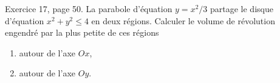\begin{exercice}\label{exo0027}

Exercice 17, page 50. La parabole d'équation $y=x^2/3$ partage le disque d'équation $x^2+y^2\leq 4$ en deux régions. Calculer le volume de révolution engendré par la plus petite de ces régions
\begin{enumerate}

\item
autour de l'axe $Ox$,
\item
autour de l'axe $Oy$.

\end{enumerate}

\end{exercice}
